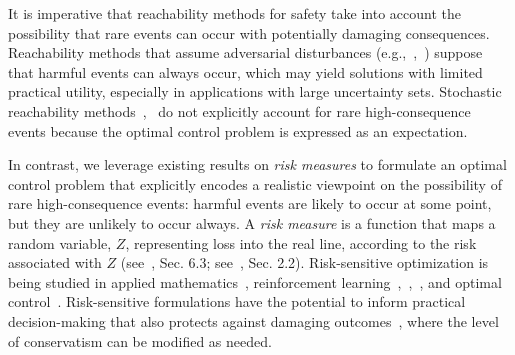 \documentclass[letterpaper, 10 pt, conference]{ieeeconf}  %
\begin{document}
It is imperative that reachability methods for safety take into account the possibility that rare events can occur
with potentially damaging consequences. 
Reachability methods that assume adversarial disturbances (e.g.,~\cite{bansal2017hamilton},~\cite{bertsekas1971minimax}) suppose that harmful events can always occur,
which may yield solutions with limited practical utility, especially in applications with large uncertainty sets.
Stochastic reachability methods~\cite{abate2008probabilistic},~\cite{summers2010verification} do not explicitly account for rare high-consequence events
because the optimal control problem is expressed as an expectation. 

In contrast, we leverage existing results on \textit{risk measures} to formulate an optimal control problem
that explicitly encodes a realistic viewpoint on the possibility of rare high-consequence events: 
harmful events are likely to occur at some point, but they are unlikely to occur always.
A \textit{risk measure} is a function that maps a random variable, $Z$, representing loss into the real line,
according to the risk associated with $Z$ (see~\cite{shapiro2009lectures}, Sec. 6.3; see~\cite{kisiala2015conditional}, Sec. 2.2).
Risk-sensitive optimization
is being studied in applied mathematics~\cite{ruszczynski2010risk}, reinforcement learning~\cite{osogami2012robustness},~\cite{chow2015risk},~\cite{ratliff2017risk}, and optimal control~\cite{chow2014framework}.\footnotemark
{} 
Risk-sensitive formulations have the potential to inform practical decision-making that also protects
against damaging outcomes~\cite{serraino2013conditional}, where the level of conservatism can be modified as needed.
\end{document}
